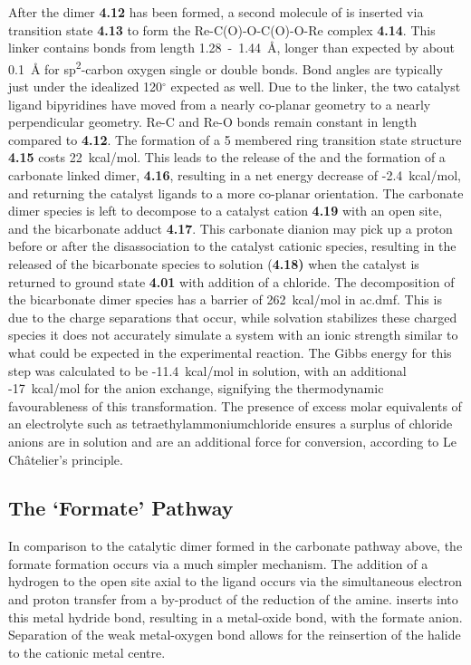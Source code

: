 After the dimer \textbf{4.12} has been formed, a second molecule of  is inserted via transition state \textbf{4.13} to form the Re-C(O)-O-C(O)-O-Re complex \textbf{4.14}. This linker contains bonds from length 1.28~-~1.44~\r{A}, longer than expected by about 0.1~\r{A} for sp\textsuperscript{2}-carbon oxygen single or double bonds\autocite{crc1998}. Bond angles are typically just under the idealized 120$^\circ$ expected as well. Due to the linker, the two catalyst ligand bipyridines have moved from a nearly co-planar geometry to a nearly perpendicular geometry. Re-C and Re-O bonds remain constant in length compared to \textbf{4.12}. The formation of a 5 membered ring transition state structure \textbf{4.15} costs 22~kcal/mol. This leads to the release of the  and the formation of a carbonate linked dimer, \textbf{4.16}, resulting in a net energy decrease of -2.4~kcal/mol, and returning the catalyst ligands to a more co-planar orientation. The carbonate dimer species is left to decompose to a catalyst cation \textbf{4.19} with an open site, and the bicarbonate adduct \textbf{4.17}. This carbonate dianion may pick up a proton before or after the disassociation to the catalyst cationic species, resulting in the released of the bicarbonate species to solution (\textbf{4.18)} when the catalyst is returned to ground state \textbf{4.01} with addition of a chloride. The decomposition of the bicarbonate dimer species has a barrier of 262~kcal/mol in \gls{ac.dmf}. This is due to the charge separations that occur, while solvation stabilizes these charged species it does not accurately simulate a system with an ionic strength similar to what could be expected in the experimental reaction. The Gibbs energy for this step was calculated to be -11.4~kcal/mol in solution, with an additional -17~kcal/mol for the anion exchange, signifying the thermodynamic favourableness of this transformation. The presence of excess molar equivalents of an electrolyte such as tetraethylammoniumchloride ensures a surplus of chloride anions are in solution and are an additional force for conversion, according to Le Ch\^{a}telier's principle.

\subsection{The `Formate' Pathway}\label{ss.formate}
In comparison to the catalytic dimer formed in the carbonate pathway above, the formate formation occurs via a much simpler mechanism. The addition of a hydrogen to the open site axial to the ligand occurs via the simultaneous electron and proton transfer from a by-product of the reduction of the amine.  inserts into this metal hydride bond, resulting in a metal-oxide bond, with the formate anion\autocite{creutz2007}. Separation of the weak metal-oxygen bond allows for the reinsertion of the halide to the cationic metal centre. 

